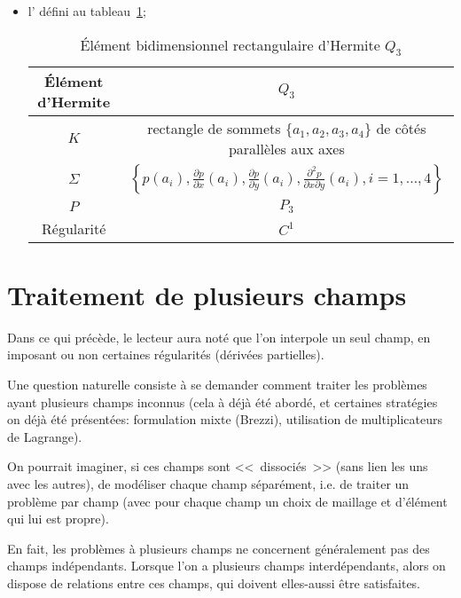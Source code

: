 \begin{itemize}
\begin{table}[ht]
\caption{Éléments bidimensionnels triangulaires d'Hermite et d'Argyris}\label{tab:ElemH:bi}
\end{table}

\item l' défini au tableau~\ref{tab:ElemH:bibi};
\begin{table}[ht]\centering\small
\begin{tabular}{c|c}
Élément d'Hermite & $Q_3$ \\
\hline
$K$	      & rectangle de sommets $\{a_1, a_2, a_3, a_4\}$ de côtés parallèles aux axes\\
$\Sigma$   & $\left\{p(a_i), \frac{\partial p}{\partial x}(a_i), \frac{\partial p}{\partial y}(a_i),
	\frac{\partial^2 p}{\partial x\partial y}(a_i), i=1,\ldots, 4\right\}$\\
$P$            & $P_3$ \\
Régularité & $C^1$\\
\hline
\end{tabular}
\caption{Élément bidimensionnel rectangulaire d'Hermite $Q_3$}\label{tab:ElemH:bibi}
\end{table}
\end{itemize}


\medskip
\section{Traitement de plusieurs champs}\label{Sec-interf}

Dans ce qui précède, le lecteur aura noté que l'on interpole un seul
champ, en imposant ou non certaines régularités (dérivées partielles).

\medskip
Une question naturelle consiste à se demander comment traiter les
problèmes ayant plusieurs champs inconnus (cela à déjà été abordé,
et certaines stratégies on déjà été présentées: formulation mixte (Brezzi),
utilisation de multiplicateurs de Lagrange).

On pourrait imaginer, si ces champs sont <<~dissociés~>> (sans lien les uns avec les
autres), de modéliser chaque champ séparément, i.e. de traiter un
problème par champ (avec pour chaque champ un choix de maillage et
d'élément qui lui est propre).

En fait, les problèmes à plusieurs champs ne concernent généralement
pas des champs indépendants.
Lorsque l'on  a plusieurs champs interdépendants, alors on dispose de relations
entre ces champs, qui doivent elles-aussi être satisfaites.

